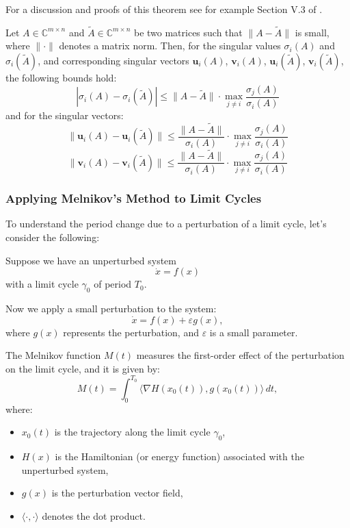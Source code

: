 \documentclass{article}
\newcounter{ct}
\begin{document}
For a discussion and proofs of this theorem see for example Section V.3 of \citet{stewart1990matrix}.


\begin{theorem}
Let \( A \in \mathbb{C}^{m \times n} \) and \( \tilde{A} \in \mathbb{C}^{m \times n} \) be two matrices such that \( \| A - \tilde{A} \| \) is small, where \( \| \cdot \| \) denotes a matrix norm. Then, for the singular values \( \sigma_i(A) \) and \( \sigma_i(\tilde{A}) \), and corresponding singular vectors \( \mathbf{u}_i(A) \), \( \mathbf{v}_i(A) \), \( \mathbf{u}_i(\tilde{A}) \), \( \mathbf{v}_i(\tilde{A}) \), the following bounds hold:
\[
\left| \sigma_i(A) - \sigma_i(\tilde{A}) \right| \leq \| A - \tilde{A} \| \cdot \max_{j \neq i} \frac{\sigma_j(A)}{\sigma_i(A)}
\]
and for the singular vectors:
\[
\| \mathbf{u}_i(A) - \mathbf{u}_i(\tilde{A}) \| \leq \frac{\| A - \tilde{A} \|}{\sigma_i(A)} \cdot \max_{j \neq i} \frac{\sigma_j(A)}{\sigma_i(A)}
\]
\[
\| \mathbf{v}_i(A) - \mathbf{v}_i(\tilde{A}) \| \leq \frac{\| A - \tilde{A} \|}{\sigma_i(A)} \cdot \max_{j \neq i} \frac{\sigma_j(A)}{\sigma_i(A)}
\]
\end{theorem}




\subsubsection{Applying Melnikov’s Method to Limit Cycles}

To understand the period change due to a perturbation of a limit cycle, let’s consider the following:

Suppose we have an unperturbed system
\[
\dot{x} = f(x)
\]
with a limit cycle \(\gamma_0\) of period \(T_0\).

Now we apply a small perturbation to the system:
\[
\dot{x} = f(x) + \varepsilon g(x),
\]
where \(g(x)\) represents the perturbation, and \(\varepsilon\) is a small parameter.

The Melnikov function \(M(t)\) measures the first-order effect of the perturbation on the limit cycle, and it is given by:
\[
M(t) = \int_0^{T_0} \langle \nabla H(x_0(t)), g(x_0(t)) \rangle \, dt,
\]
where:
\begin{itemize}
    \item \(x_0(t)\) is the trajectory along the limit cycle \(\gamma_0\),
    \item \(H(x)\) is the Hamiltonian (or energy function) associated with the unperturbed system,
    \item \(g(x)\) is the perturbation vector field,
    \item \(\langle \cdot, \cdot \rangle\) denotes the dot product.
\end{itemize}
\end{document}
